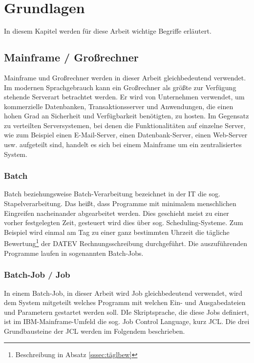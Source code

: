 \chapter{Grundlagen}\label{ch:grundlagen}
In diesem Kapitel werden für diese Arbeit wichtige Begriffe erläutert.

\section{Mainframe / Großrechner}\label{sec:mainframe}
Mainframe und Großrechner werden in dieser Arbeit gleichbedeutend verwendet.
Im modernen Sprachgebrauch kann ein Großrechner als größte zur Verfügung stehende Serverart betrachtet werden.
Er wird von Unternehmen verwendet, um  kommerzielle Datenbanken, Transaktionsserver und Anwendungen, die einen hohen Grad an Sicherheit und Verfügbarkeit benötigten, zu hosten.
Im Gegensatz zu verteilten Serversystemen, bei denen die Funktionalitäten auf einzelne Server, wie zum Beispiel einen E-Mail-Server, einen Datenbank-Server, einen Web-Server usw. aufgeteilt sind, handelt es sich bei einem Mainframe um ein zentralisiertes System.
\cite{Ebbers.2011}

\subsection{Batch}
Batch beziehungsweise Batch-Verarbeitung bezeichnet in der IT die sog. \glqq Stapelverarbeitung\grqq.
Das heißt, dass Programme mit minimalem menschlichen Eingreifen nacheinander abgearbeitet werden.
Dies geschieht meist zu einer vorher festgelegten Zeit, gesteuert wird dies über sog. \glqq Scheduling\grqq-Systeme.
Zum Beispiel wird einmal am Tag zu einer ganz bestimmten Uhrzeit die tägliche Bewertung\footnote{Beschreibung in Absatz \ref{sssec:täglbew}} der DATEV Rechnungsschreibung durchgeführt.
Die auszuführenden Programme laufen in sogenannten \glqq Batch-Jobs\grqq.
\cite{Ebbers.2011}

\subsection{Batch-Job / Job}\label{ssec:job}
In einem Batch-Job, in dieser Arbeit wird \glqq Job\grqq{} gleichbedeutend verwendet, wird dem System mitgeteilt welches Programm mit welchen Ein- und Ausgabedateien und Parametern gestartet werden soll.
DIe Skriptsprache, die diese Jobs definiert, ist im IBM-Mainframe-Umfeld die sog. \glqq Job Control Language\grqq, kurz JCL.
Die drei Grundbausteine der JCL werden im Folgendem beschrieben.

